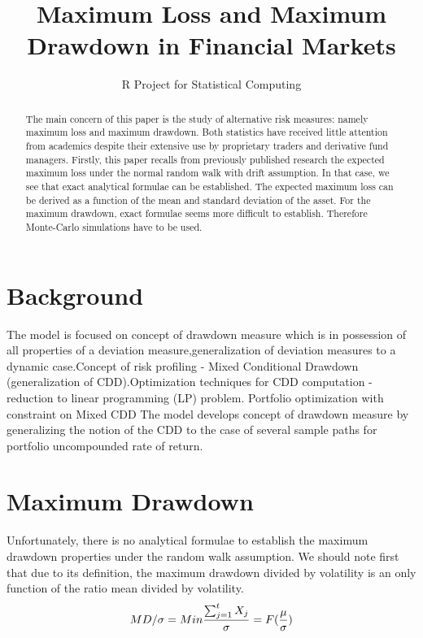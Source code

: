 \documentclass[12pt,letterpaper,english]{article}
\title{Maximum Loss and Maximum Drawdown in Financial Markets}
\author{R Project for Statistical Computing}
\begin{document}


\maketitle


\begin{abstract}
The main concern of this paper is the study of alternative risk measures: namely maximum loss and 
maximum drawdown. Both statistics have received little attention from academics despite their  extensive use by proprietary traders and derivative fund managers. 
Firstly, this paper recalls from previously published research the expected maximum loss under the  normal random walk with drift assumption. In that case, we see that exact analytical formulae can be established. The expected maximum loss can be derived as a function of the mean and standard deviation of the asset. For the maximum drawdown, exact formulae seems more difficult to establish. 
Therefore Monte-Carlo simulations have to be used. 
\end{abstract}



\section{Background}

The model is focused on concept of drawdown measure which is in possession of all properties of a deviation measure,generalization of deviation measures to a dynamic case.Concept of risk profiling - Mixed Conditional Drawdown (generalization of CDD).Optimization techniques for CDD computation - reduction to linear programming (LP) problem. Portfolio optimization with constraint on Mixed CDD
The model develops concept of drawdown measure by generalizing the notion
of the CDD to the case of several sample paths for portfolio uncompounded rate
of return.


\section{Maximum Drawdown}
Unfortunately, there is no analytical formulae to establish the maximum drawdown properties under the random walk assumption. We should note first that due to its definition, the maximum drawdown divided by volatility is an only function of the ratio mean divided by volatility. 
\begin{equation}
MD / \sigma =  Min \frac{ \sum_{j=1}^{t} X_{j}}{\sigma} = F(\frac{\mu}{\sigma}) \\
\end{equation}
\end{document}
